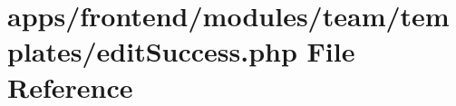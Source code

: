 \hypertarget{frontend_2modules_2team_2templates_2edit_success_8php}{\section{apps/frontend/modules/team/templates/edit\-Success.php File Reference}
\label{frontend_2modules_2team_2templates_2edit_success_8php}
}
